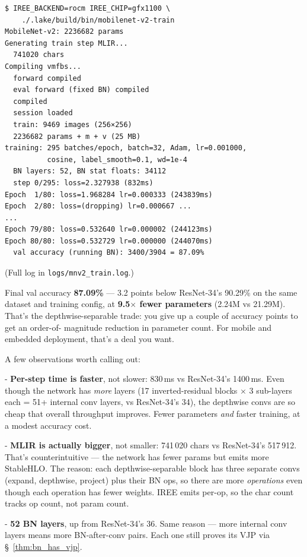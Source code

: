 \begin{verbatim}
$ IREE_BACKEND=rocm IREE_CHIP=gfx1100 \
    ./.lake/build/bin/mobilenet-v2-train
MobileNet-v2: 2236682 params
Generating train step MLIR...
  741020 chars
Compiling vmfbs...
  forward compiled
  eval forward (fixed BN) compiled
  compiled
  session loaded
  train: 9469 images (256×256)
  2236682 params + m + v (25 MB)
training: 295 batches/epoch, batch=32, Adam, lr=0.001000,
          cosine, label_smooth=0.1, wd=1e-4
  BN layers: 52, BN stat floats: 34112
  step 0/295: loss=2.327938 (832ms)
Epoch  1/80: loss=1.968284 lr=0.000333 (243839ms)
Epoch  2/80: loss=(dropping) lr=0.000667 ...
...
Epoch 79/80: loss=0.532640 lr=0.000002 (244123ms)
Epoch 80/80: loss=0.532729 lr=0.000000 (244070ms)
  val accuracy (running BN): 3400/3904 = 87.09%
\end{verbatim}

(Full log in \texttt{logs/mnv2\_train.log}.)

Final val accuracy \textbf{87.09\%} --- 3.2 points below ResNet-34's
90.29\% on the same dataset and training config, at \textbf{9.5$\times$
fewer parameters} (2.24M vs 21.29M). That's the depthwise-separable
trade: you give up a couple of accuracy points to get an order-of-
magnitude reduction in parameter count. For mobile and embedded
deployment, that's a deal you want.

A few observations worth calling out:

- \textbf{Per-step time is faster}, not slower: 830\,ms vs
  ResNet-34's 1400\,ms. Even though the network has \emph{more}
  layers (17 inverted-residual blocks $\times$ 3 sub-layers each =
  51+ internal conv layers, vs ResNet-34's 34), the depthwise convs
  are so cheap that overall throughput improves. Fewer parameters
  \emph{and} faster training, at a modest accuracy cost.

- \textbf{MLIR is actually bigger}, not smaller: 741\,020 chars vs
  ResNet-34's 517\,912. That's counterintuitive --- the network has
  fewer params but emits more StableHLO. The reason: each
  depthwise-separable block has three separate convs (expand,
  depthwise, project) plus their BN ops, so there are more
  \emph{operations} even though each operation has fewer weights.
  IREE emits per-op, so the char count tracks op count, not param
  count.

- \textbf{52 BN layers}, up from ResNet-34's 36. Same reason ---
  more internal conv layers means more BN-after-conv
  pairs. Each one still proves its VJP via
  \S~\ref{thm:bn_has_vjp}.

